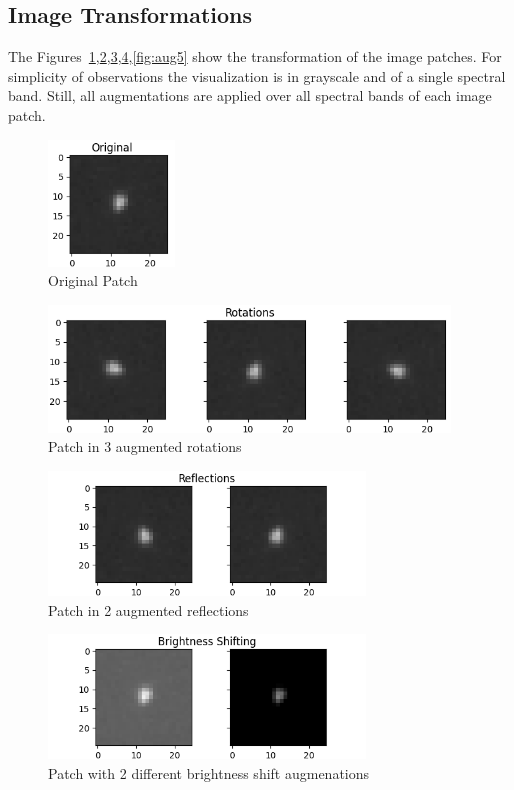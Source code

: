 \documentclass[
a4paper,     %
10pt         %
]{scrartcl}  %
\begin{document}
\subsection{Image Transformations}
\label{subsec:aug_trans}

The Figures~\ref{fig:aug1},\ref{fig:aug2},\ref{fig:aug3},\ref{fig:aug4},\ref{fig:aug5} show the transformation of the image patches.
For simplicity of observations the visualization is in grayscale and of a single spectral band.
Still, all augmentations are applied over all spectral bands of each image patch.
\begin{figure}[h]
    \center
    \includegraphics[width=0.3\textwidth]{figures/augment_original}
    \caption{Original Patch}\label{fig:aug1}
\end{figure}
\begin{figure}[h]
    \center
    \includegraphics[width=0.95\textwidth]{figures/augment_rotations}
    \caption{Patch in 3 augmented rotations}\label{fig:aug2}
\end{figure}
\begin{figure}[h]
    \center
    \includegraphics[width=0.75\textwidth]{figures/augment_reflections}
    \caption{Patch in 2 augmented reflections}\label{fig:aug3}
\end{figure}
\begin{figure}[h]
    \center
    \includegraphics[width=0.75\textwidth]{figures/augment_shift}
    \caption{Patch with 2 different brightness shift augmenations}\label{fig:aug4}
\end{figure}
\end{document}
